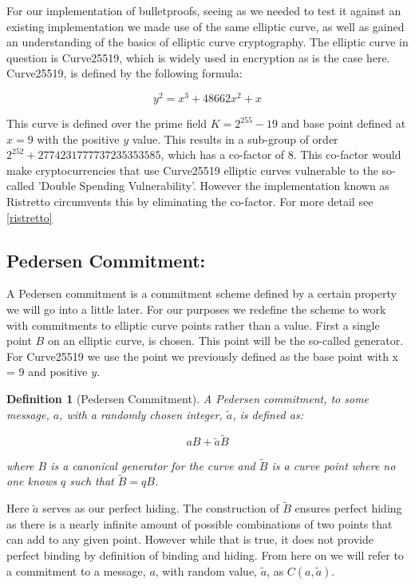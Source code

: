 \documentclass{article}
\newtheorem{definition}{Definition}[section]
\newcommand{\blind}[1]{\widetilde{#1}}
\newcommand{\tB}{\widetilde{B}}
\newcommand{\ba}{\widetilde{a}}
\begin{document}
For our implementation of bulletproofs, seeing as we needed to test it
against an existing implementation we made use of the same elliptic
curve, as well as gained an understanding of the basics of elliptic
curve cryptography. The elliptic curve in question is Curve25519, which
is widely used in encryption as is the case here. Curve25519, is defined by the following formula:

$$y^2 = x^3 + 48662x^2 + x$$

This curve is defined over the prime field $K = 2^{255} - 19$ and base
point defined at $x = 9$ with the positive $y$ value. This results in a
sub-group of order $2^{252} + 2774231777737235353585$, which has a
co-factor of $8$. This co-factor would make cryptocurrencies that use
Curve25519 elliptic curves vulnerable to the so-called 'Double Spending
Vulnerability'. However the implementation known as Ristretto circumvents
this by eliminating the co-factor. For more detail see \ref{ristretto}

\subsection{Pedersen Commitment:}

A Pedersen commitment is a commitment scheme defined by a certain
property we will go into a little later. For our purposes we redefine
the scheme to work with commitments to elliptic curve points rather than
a value. First a single point $B$ on an elliptic curve, is chosen. This point will be the so-called generator. For
Curve25519 we use the point we previously defined as the base point with x =
9 and positive $y$.

\begin{definition}[Pedersen Commitment]
	A Pedersen commitment, to some message, $a$, with a randomly chosen
	integer, $\ba$, is defined as:

	$$aB + \ba\blind{B}$$

	where $B$ is a canonical generator for the curve and $\tB$
	is a curve point where no one knows $q$ such that $\tB = qB$.
\end{definition}

Here $\widetilde{a}$ serves as our perfect hiding. The construction of $\tB$ ensures perfect hiding as there is a nearly infinite
amount of possible combinations of two points that can add to any given
point. However while that is true, it does not provide perfect binding by
definition of binding and hiding. From here on we will refer to a
commitment to a message, $a$, with random value, $\widetilde{a}$, as $C(a,\widetilde{a})$.
\end{document}
